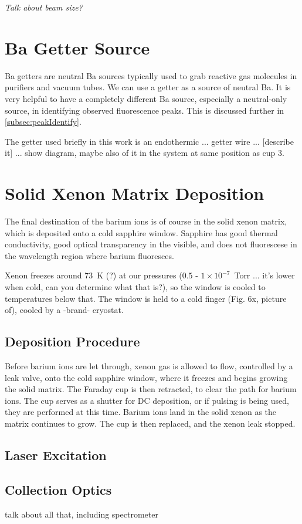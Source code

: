 {\color{gray}\emph{Talk about beam size?}}

\section{Ba Getter Source}

Ba getters are neutral Ba sources typically used to grab reactive gas molecules in purifiers and vacuum tubes.  We can use a getter as a source of neutral Ba.  It is very helpful to have a completely different Ba source, especially a neutral-only source, in identifying observed fluorescence peaks.  This is discussed further in \ref{subsec:peakIdentify}.

The getter used briefly in this work is an endothermic ... getter wire ... {\color{gray}[describe it]} ... show diagram, maybe also of it in the system at same position as cup 3.

\section{Solid Xenon Matrix Deposition}

The final destination of the barium ions is of course in the solid xenon matrix, which is deposited onto a cold sapphire window.  Sapphire has good thermal conductivity, good optical transparency in the visible, and does not fluorescese in the wavelength region where barium fluoresces.  

Xenon freezes around 73~K (?) at our pressures ({\color{red}$0.5$ - $1 \times 10^{-7}$~Torr ... it's lower when cold, can you determine what that is?}), so the window is cooled to temperatures below that.  The window is held to a cold finger (Fig. 6x, picture of), cooled by a -brand- cryostat. %

\subsection{Deposition Procedure}

Before barium ions are let through, xenon gas is allowed to flow, controlled by a leak valve, onto the cold sapphire window, where it freezes and begins growing the solid matrix.  The Faraday cup is then retracted, to clear the path for barium ions.  The cup serves as a shutter for DC deposition, or if pulsing is being used, they are performed at this time.  Barium ions land in the solid xenon as the matrix continues to grow.  The cup is then replaced, and the xenon leak stopped.

\subsection{Laser Excitation}

\subsection{Collection Optics}

talk about all that, including spectrometer